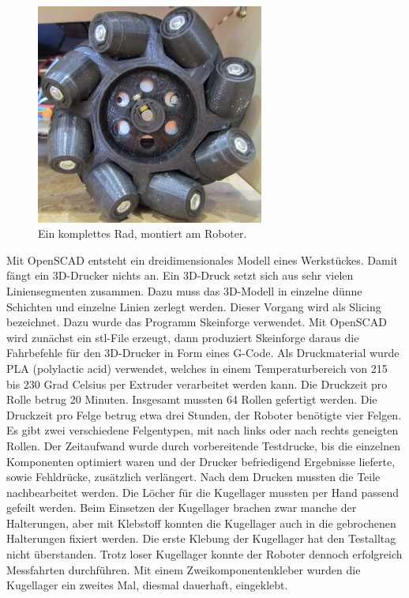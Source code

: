 \documentclass[a4paper,bibtotoc,oneside]{scrbook}
\begin{document}
\begin{figure}[htbp]
\centering
\includegraphics[width=75mm]{img/rad.jpg}
\caption{Ein komplettes Rad, montiert am Roboter.}\label{rad2}
\end{figure}


\noindent Mit OpenSCAD entsteht ein dreidimensionales Modell eines Werkstückes. Damit fängt ein 3D-Drucker nichts an. Ein 3D-Druck setzt sich aus sehr vielen Liniensegmenten zusammen. Dazu muss das 3D-Modell in einzelne dünne Schichten und einzelne Linien zerlegt werden. Dieser Vorgang wird als Slicing bezeichnet. Dazu wurde das Programm Skeinforge verwendet. Mit OpenSCAD wird zunächst ein stl-File erzeugt, dann produziert Skeinforge daraus die Fahrbefehle für den 3D-Drucker in Form eines G-Code. Als Druckmaterial wurde PLA (polylactic acid) verwendet, welches in einem Temperaturbereich von 215 bis 230 Grad Celsius per Extruder verarbeitet werden kann.    
Die Druckzeit pro Rolle betrug 20 Minuten. Insgesamt mussten 64 Rollen gefertigt werden. Die Druckzeit pro Felge betrug etwa drei Stunden, der Roboter benötigte vier Felgen. Es gibt zwei verschiedene Felgentypen, mit nach links oder nach rechts geneigten Rollen. 
Der Zeitaufwand wurde durch vorbereitende Testdrucke, bis die einzelnen Komponenten optimiert waren und der Drucker befriedigend Ergebnisse lieferte, sowie Fehldrücke, zusätzlich verlängert. 
Nach dem Drucken mussten die Teile nachbearbeitet werden. Die Löcher für die Kugellager mussten per Hand passend gefeilt werden. Beim  Einsetzen der Kugellager brachen zwar manche der Halterungen, aber mit Klebstoff konnten die Kugellager auch in die gebrochenen Halterungen fixiert werden. Die erste Klebung der Kugellager hat den Testalltag nicht überstanden. Trotz loser Kugellager konnte der Roboter dennoch erfolgreich Messfahrten durchführen. Mit einem Zweikomponentenkleber wurden die Kugellager ein zweites Mal, diesmal dauerhaft, eingeklebt.
\end{document}

